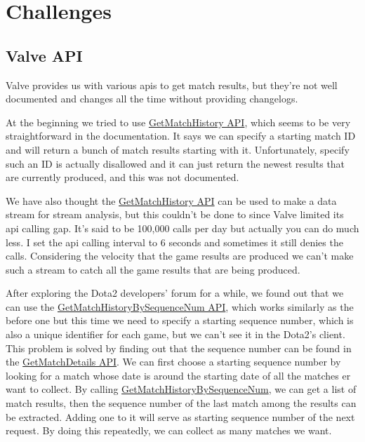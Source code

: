\documentclass{article}
\begin{document}
\section{Challenges}

\subsection{Valve API}

Valve provides us with various apis to get match results, but they're not well documented and changes all the time without providing changelogs.

At the beginning we tried to use \href{https://wiki.teamfortress.com/wiki/WebAPI/GetMatchHistory}{GetMatchHistory API}, which seems to be very straightforward in the documentation.
It says we can specify a starting match ID and will return a bunch of match results starting with it.
Unfortunately, specify such an ID is actually disallowed and it can just return the newest results that are currently produced, and this was not documented.

We have also thought the \href{https://wiki.teamfortress.com/wiki/WebAPI/GetMatchHistory}{GetMatchHistory API} can be used to make a data stream for stream analysis, but this couldn't be done to since Valve limited its api calling gap.
It's said to be 100,000 calls per day but actually you can do much less. I set the api calling interval to 6 seconds and sometimes it still denies the calls.
Considering the velocity that the game results are produced we can't make such a stream to catch all the game results that are being produced.

After exploring the Dota2 developers' forum for a while, we found out that we can use the \href{https://wiki.teamfortress.com/wiki/WebAPI/GetMatchHistoryBySequenceNum}{GetMatchHistoryBySequenceNum API}, which works similarly as the before one but this time we need to specify a starting sequence number, which is also a unique identifier for each game, but we can't see it in the Dota2's client.
This problem is solved by finding out that the sequence number can be found in the \href{https://wiki.teamfortress.com/wiki/WebAPI/GetMatchDetails}{GetMatchDetails API}.
We can first choose a starting sequence number by looking for a match whose date is around the starting date of all the matches er want to collect.
By calling \href{https://wiki.teamfortress.com/wiki/WebAPI/GetMatchHistoryBySequenceNum}{GetMatchHistoryBySequenceNum}, we can get a list of match results, then the sequence number of the last match among the results can be extracted. Adding one to it will serve as starting sequence number of the next request. By doing this repeatedly, we can collect as many matches we want.
\end{document}
